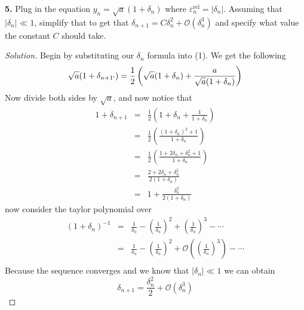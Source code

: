 \documentclass[12pt]{amsart}
\newenvironment{solution}
{\begin{proof}[Solution]}
{\end{proof}}
\begin{document}
\begin{onehalfspace}
        \textbf{5.} Plug in the equation $y_n = \sqrt{a}(1 + \delta_n)$ where $\varepsilon_n^{\text{rel}} = |\delta_n|$.
        Assuming that $|\delta_n|\ll 1$, simplify that to get that $\delta_{n+1} = C\delta_n^2 + \mathcal{O}(\delta_n^3)$
        and specify what value the constant $C$ should take.
        \begin{solution}
            Begin by substituting our $\delta_n$ formula into (1). We get the following
            \begin{displaymath}
                \sqrt{a}(1 + \delta_{n+1`})  = \frac{1}{2}\left(\sqrt{a}(1 + \delta_n)
                                                              + \frac{a}{\sqrt{a}(1+\delta_n)} \right)
            \end{displaymath}
            Now divide both sides by $\sqrt{a}$, and now notice that
            \begin{align*}
                1 + \delta_{n+1} & = & \frac{1}{2} \left( 1 + \delta_n + \frac{1}{1+\delta_n}\right) \\
                                 & = & \frac{1}{2} \left( \frac{(1 + \delta_n)^2 + 1} {1+\delta_n}\right) \\
                                 & = & \frac{1}{2} \left( \frac{1 + 2\delta_n + \delta_n^2 + 1}{1+\delta_n}\right) \\
                                 & = & \frac{2 + 2\delta_n + \delta_n^2}{2(1+\delta_n)} \\
                                 & = & 1 + \frac{\delta_n^2}{2(1+\delta_n)}
            \end{align*}
            now consider the taylor polynomial over
            \begin{align*}
                (1+\delta_n)^{-1} & = & \frac{1}{\delta_n} - \left(\frac{1}{\delta_n}\right)^2 + \left(\frac{1}{\delta_n}\right)^3 - \cdots\\
                                  & = & \frac{1}{\delta_n} - \left(\frac{1}{\delta_n}\right)^2 + \mathcal{O}\left(\left(\frac{1}{\delta_n}\right)^3\right) - \cdots\\
            \end{align*}
            Because the sequence converges and we know that $|\delta_n|\ll 1$ we can obtain
            \begin{displaymath}
                \delta_{n+1} = \frac{\delta_n^2}{2} + \mathcal{O}(\delta^3_n)
            \end{displaymath}
        \end{solution}


\end{onehalfspace}
\end{document}
